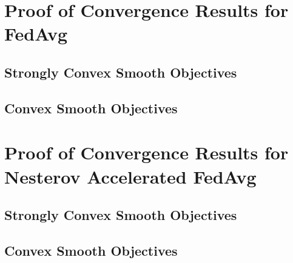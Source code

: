 


\section{Proof of Convergence Results for FedAvg}
\label{sec:app:fedavg}
\subsection{Strongly Convex Smooth Objectives}


\subsection{Convex Smooth Objectives}
\label{sec:nasgdscvxsmth}
%


\section{Proof of Convergence Results for Nesterov Accelerated FedAvg}
\label{sec:app:Nesterovfedavg}
\subsection{Strongly Convex Smooth Objectives}
\label{sec:convexsmoothsgd}
%


\subsection{Convex Smooth Objectives}
\label{sec:nasgdcvxsmth}
%


